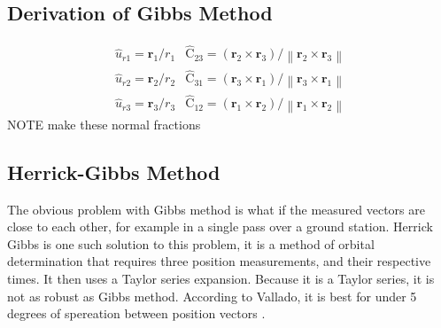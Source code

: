 \documentclass[12pt]{article}
\begin{document}
	
	\subsection{Derivation of Gibbs Method}
	\begin{eqnarray}
	\hat { { u } } _ { r 1 } = \mathbf { r } _ { 1 } / r _ { 1 }& \hat { \mathrm { C } } _ { 23 } = \left( \mathbf { r } _ { 2 } \times \mathbf { r } _ { 3 } \right) / \left\| \mathbf { r } _ { 2 } \times \mathbf { r } _ { 3 } \right\|\\
	\hat {{ u } } _ { r 2 } = \mathbf { r } _ { 2 } / r _ { 2 }&\hat { \mathrm { C } } _ { 31 } = \left( \mathbf { r } _ { 3 } \times \mathbf { r } _ { 1} \right) / \left\| \mathbf { r } _ { 3 } \times \mathbf { r } _ { 1 } \right\|\\
		\hat {{ u } } _ { r 3 } = \mathbf { r } _ { 3 } / r _ { 3} & \hat { \mathrm { C } } _ { 12 } = \left( \mathbf { r } _ { 1 } \times \mathbf { r } _ { 2 } \right) / \left\| \mathbf { r } _ { 1} \times \mathbf { r } _ { 2 } \right\|
	\end{eqnarray}
	NOTE make these normal fractions
	\fi
	\subsection{Herrick-Gibbs Method}
	The obvious problem with Gibbs method is what if the measured vectors are close to each other, for example in a single pass over a ground station. Herrick Gibbs is one such solution to this problem, it is a method of orbital determination that requires three position measurements, and their respective times. It then uses a Taylor series expansion. Because it is a Taylor series, it is not as robust as Gibbs method. According to Vallado, it is best for under 5 degrees of spereation between position vectors \cite{vallado2007fundamentals}.
	
\end{document}
